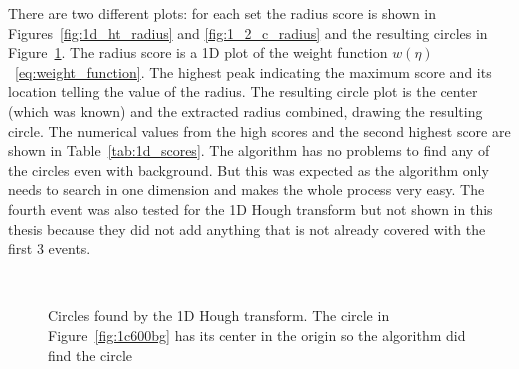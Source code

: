 \documentclass[11pt]{scrreprt}
\begin{document}
There are two different plots: for each set the radius score is shown in Figures~\ref{fig:1d_ht_radius} and \ref{fig:1_2_c_radius} and the resulting
circles in Figure~\ref{fig:1d_ht_results}. The radius score is a 1D plot of the weight function 
$w(\eta)$~\ref{eq:weight_function}. The highest peak indicating the maximum score and its location telling the value of the radius.
The resulting circle plot is the center (which was known) and the extracted radius combined, drawing the resulting circle. 
The numerical values from the high scores and the second highest score are shown in Table~\ref{tab:1d_scores}. 
The algorithm has no problems to find any of  the circles even with background. But this was expected as the 
algorithm only needs to search in one dimension and makes the whole process very easy. The fourth event was also tested for the 1D Hough
transform but not shown in this thesis because they did not add anything that is not already covered with the first 3 events.

\begin{figure}[htp]
        \centering
        ~ %
                \label{fig:2c0bg}
        ~ %
                \label{fig:5c30bg}
        \caption{Circles found by the 1D Hough transform. The circle in Figure~\ref{fig:1c600bg} has its center in the origin so the algorithm did find the circle}\label{fig:1d_ht_results}
\end{figure}
\end{document}
